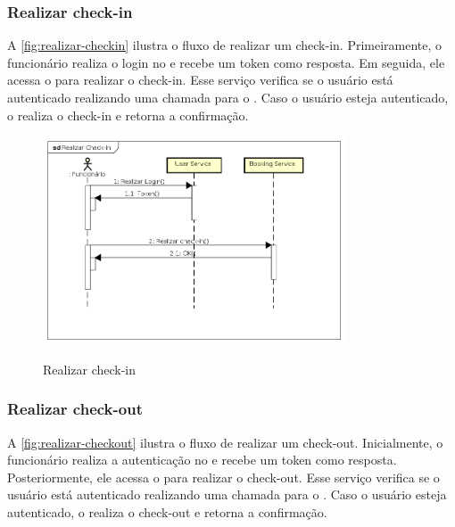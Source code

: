 \subsubsection{Realizar check-in}
A \autoref{fig:realizar-checkin} ilustra o fluxo de realizar um check-in. Primeiramente, o funcionário realiza o login no  e recebe um token como resposta. Em seguida, ele acessa o  para realizar o check-in. Esse serviço verifica se o usuário está autenticado realizando uma chamada para o . Caso o usuário esteja autenticado, o  realiza o check-in e retorna a confirmação.

\begin{figure}[H]
    \centering
    \caption{Realizar check-in}
    \includegraphics[width=0.8\textwidth]{media/realizar-checkin.png}
    \label{fig:realizar-checkin}
\end{figure}

\subsubsection{Realizar check-out}
A \autoref{fig:realizar-checkout} ilustra o fluxo de realizar um check-out. Inicialmente, o funcionário realiza a autenticação no  e recebe um token como resposta. Posteriormente, ele acessa o  para realizar o check-out. Esse serviço verifica se o usuário está autenticado realizando uma chamada para o . Caso o usuário esteja autenticado, o  realiza o check-out e retorna a confirmação.

